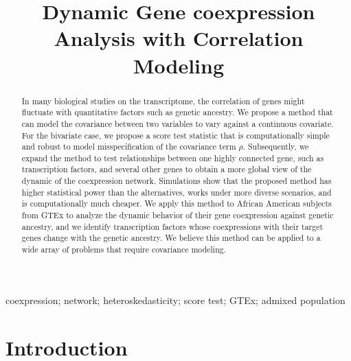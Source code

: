 \documentclass[aoas,authoryear, preprint]{imsart}
\numberwithin{equation}{section}
\theoremstyle{plain}
\begin{document}
\begin{frontmatter}
\title{Dynamic Gene coexpression Analysis with Correlation Modeling}


\begin{abstract}
In many biological studies on the transcriptome, the correlation of genes might fluctuate with quantitative factors such as genetic ancestry. We propose a method that can model the covariance between two variables to vary against a continuous covariate. For the bivariate case, we propose a score test statistic that is computationally simple and robust to model misspecification of the covariance term $\rho$. Subsequently, we expand the method to test relationships between one highly connected gene, such as transcription factors, and several other genes to obtain a more global view of the dynamic of the coexpression network. Simulations show that the proposed method has higher statistical power than the alternatives, works under more diverse scenarios, and is computationally much cheaper. We apply this method to African American subjects from GTEx to analyze the dynamic behavior of their gene coexpression against genetic ancestry, and we identify transcription factors whose coexpressions with their target genes change with the genetic ancestry. We believe this method can be applied to a wide array of problems that require covariance modeling.
\end{abstract}

\begin{keyword}
coexpression; network; heteroskedasticity; score test; GTEx; admixed population
\end{keyword}

\end{frontmatter}
\section{Introduction}
\end{document}

